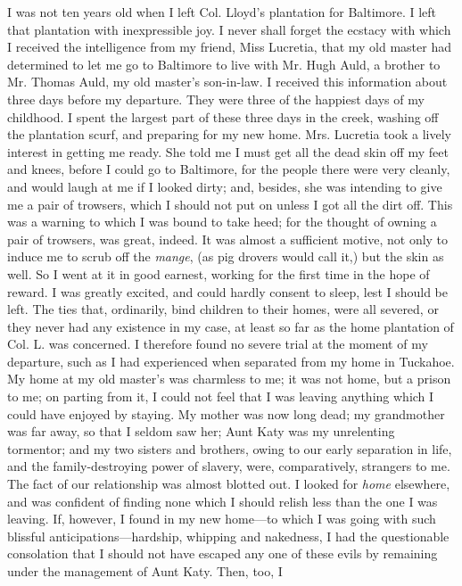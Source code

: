 I was not ten years old when I left Col. Lloyd's plantation for
Baltimore. I left that plantation with inexpressible joy. I never shall
forget the ecstacy with which I received the intelligence from my
friend, Miss Lucretia, that my old master had determined to let me go to
Baltimore to live with Mr. Hugh Auld, a brother to Mr. Thomas Auld, my
old master's son-in-law. I received this information about three days
before my departure. They were three of the happiest days of my
childhood. I spent the largest part of these three days in the creek,
washing off the plantation scurf, and preparing for my new home. Mrs.
Lucretia took a lively interest in getting me ready. She told me I must
get all the dead skin off my feet and knees, before I could go to
Baltimore, for the people there were very cleanly, and would laugh at me
if I looked dirty; and, besides, she was intending to give me a pair of
trowsers, which I should not put on unless I got all the dirt off. This
was a warning to which I was bound to take heed; for the thought of
owning a pair of trowsers, was great, indeed. It was almost a sufficient
motive, not only to induce me to scrub off the \emph{mange}, (as pig
drovers would call it,) but the skin as well. So I went at it in good
earnest, working for the first time in the hope of reward. I was greatly
excited, and could hardly consent to sleep, lest I should be left. The
ties that, ordinarily, bind children to their homes, were all severed,
or they never had any existence in {\protect\hypertarget{135}{}{}}my
case, at least so far as the home plantation of Col. L. was concerned. I
therefore found no severe trial at the moment of my departure, such as I
had experienced when separated from my home in Tuckahoe. My home at my
old master's was charmless to me; it was not home, but a prison to me;
on parting from it, I could not feel that I was leaving anything which I
could have enjoyed by staying. My mother was now long dead; my
grandmother was far away, so that I seldom saw her; Aunt Katy was my
unrelenting tormentor; and my two sisters and brothers, owing to our
early separation in life, and the family-destroying power of slavery,
were, comparatively, strangers to me. The fact of our relationship was
almost blotted out. I looked for \emph{home} elsewhere, and was
confident of finding none which I should relish less than the one I was
leaving. If, however, I found in my new home---to which I was going with
such blissful anticipations---hardship, whipping and nakedness, I had
the questionable consolation that I should not have escaped any one of
these evils by remaining under the management of Aunt Katy. Then, too, I
